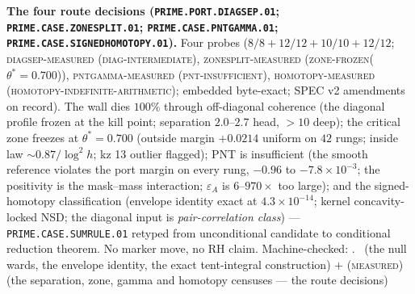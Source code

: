 \documentclass[11pt,a4paper]{article}
\theoremstyle{definition}
\begin{document}
\par\smallskip\noindent\textbf{The four route decisions
(\texttt{PRIME.PORT.\allowbreak DIAGSEP.01};
\texttt{PRIME.CASE.\allowbreak ZONESPLIT.01};
\texttt{PRIME.CASE.\allowbreak PNTGAMMA.01};
\texttt{PRIME.CASE.\allowbreak SIGNEDHOMOTOPY.01}).}
Four probes ($8/8 + 12/12 + 10/10 + 12/12$;
\textsc{diagsep-measured (diag-intermediate)},
\textsc{zonesplit-measured (zone-frozen($\theta^{*} = 0.700$))},
\textsc{pntgamma-measured (pnt-insufficient)},
\textsc{homotopy-measured (homotopy-indefinite-arithmetic)};
embedded byte-exact; SPEC v2 amendments on record).  The wall
dies $100\%$ through off-diagonal coherence (the diagonal
profile frozen at the kill point; separation $2.0$--$2.7$ head,
$> 10$ deep); the critical zone freezes at $\theta^{*} = 0.700$
(outside margin $+0.0214$ uniform on $42$ rungs; inside law
${\sim}0.87/\log^2 h$; kz 13 outlier flagged); PNT is
insufficient (the smooth reference violates the port margin on
every rung, $-0.96$ to $-7.8\times10^{-3}$; the positivity is
the mask--mass interaction; $\varepsilon_A$ is $6$--$970\times$
too large); and the signed-homotopy classification (envelope
identity exact at $4.3\times10^{-14}$; kernel concavity-locked
NSD; the diagonal input is \emph{pair-correlation class}) ---
\texttt{PRIME.CASE.SUMRULE.01} retyped from unconditional
candidate to conditional reduction theorem.  No marker move, no
RH claim.
Machine-checked: .
\mE\ (the null wards, the envelope identity, the exact
tent-integral construction) $+$ (\textsc{measured}) (the
separation, zone, gamma and homotopy censuses --- the route
decisions)
\par\smallskip
\end{document}
